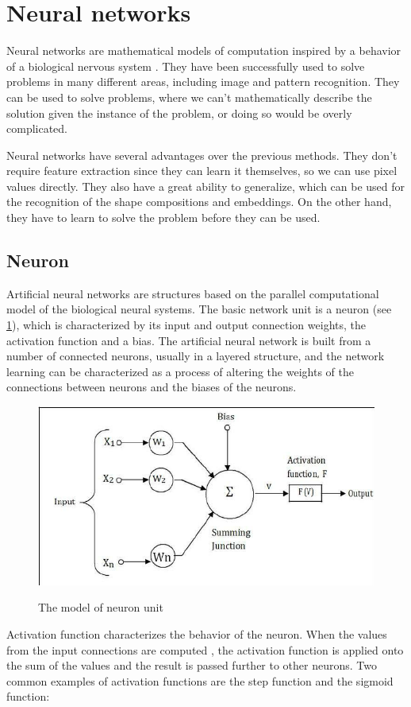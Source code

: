 \section{Neural networks}
Neural networks are mathematical models of computation inspired by a behavior of a biological nervous system \cite{bishop}. They have been successfully used to solve problems in many different areas, including image and pattern recognition. They can be used to solve problems, where we can't mathematically describe the solution given the instance of the problem, or doing so would be overly complicated. 

Neural networks have several advantages over the previous methods. They don't require feature extraction since they can learn it themselves, so we can use pixel values directly. They also have a great ability to generalize, which can be used for the recognition of the shape compositions and embeddings. On the other hand, they have to learn to solve the problem before they can be used. 

\subsection{Neuron}
Artificial neural networks are structures based on the parallel computational model of the biological neural systems. The basic network unit is a neuron (see \cref{fig:neuron}), which is characterized by its input and output connection weights, the activation function and a bias. The artificial neural network is built from a number of connected neurons, usually in a layered structure, and the network learning can be characterized as a process of altering the weights of the connections between neurons and the biases of the neurons. 

\begin{figure}
\centering
\includegraphics[width=.5\linewidth]{ext/neuron.png}
\label{fig:neuron}
\caption{The model of neuron unit}
\end{figure}

Activation function characterizes the behavior of the neuron. When the values from the input connections are computed , the activation function is applied onto the sum of the values and the result is passed further to other neurons. Two common examples of activation functions are the step function and the sigmoid function:


